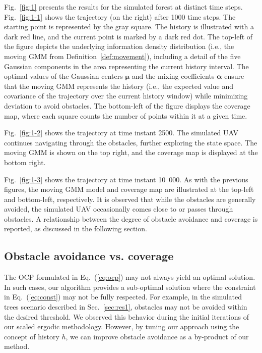 \documentclass[letterpaper,10pt,conference,twoside]{IEEEtran}
\theoremstyle{definition}
\begin{document}
Fig.~\ref{fig:1} presents the results for the simulated forest at distinct time steps. Fig.~\ref{fig:1-1} shows the trajectory (on the right) after 1000 time steps. The starting point is represented by the gray square. The history is illustrated with a dark red line, and the current point is marked by a dark red dot. The top-left of the figure depicts the underlying information density distribution (i.e., the moving GMM from Definition~\ref{def:movement}), including a detail of the five Gaussian components in the area representing the current history interval. The optimal values of the Gaussian centers $\boldsymbol{\mu}$ and the mixing coefficients $\boldsymbol{\alpha}$ ensure that the moving GMM represents the history (i.e., the expected value and covariance of the trajectory over the current history window) while minimizing deviation to avoid obstacles. The bottom-left of the figure displays the coverage map, where each square counts the number of points within it at a given time.

Fig.~\ref{fig:1-2} shows the trajectory at time instant 2500. The simulated UAV continues navigating through the obstacles, further exploring the state space. The moving GMM is shown on the top right, and the coverage map is displayed at the bottom right.

Fig.~\ref{fig:1-3} shows the trajectory at time instant 10~000. As with the previous figures, the moving GMM model and coverage map are illustrated at the top-left and bottom-left, respectively. It is observed that while the obstacles are generally avoided, the simulated UAV occasionally comes close to or passes through obstacles. A relationship between the degree of obstacle avoidance and coverage is reported, as discussed in the following section.


\subsection{Obstacle avoidance vs. coverage}\label{sec:res2}
\noindent
The OCP formulated in Eq.~(\ref{eq:ocp}) may not always yield an optimal solution. In such cases, our algorithm provides a sub-optimal solution where the constraint in Eq.~(\ref{eq:const}) may not be fully respected. For example, in the simulated trees scenario described in Sec.~\ref{sec:res1}, obstacles may not be avoided within the desired threshold. We observed this behavior during the initial iterations of our scaled ergodic methodology. However, by tuning our approach using the concept of history $h$, we can improve obstacle avoidance as a by-product of our method.
\end{document}

